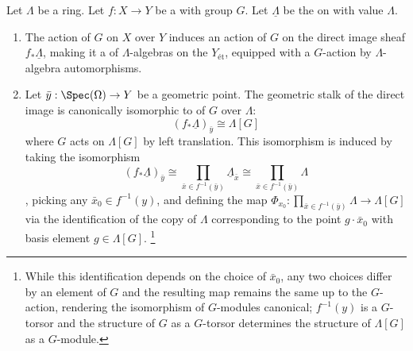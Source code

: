 \begin{proposition} \label{proposition:pushforward_of_constant_sheaf_along_finite_etale_G_cover_has_group_ring_structure}
Let $\Lambda$ be a ring. Let $f: X \to Y$ be a  with group $G$. Let $\underline{\Lambda}$ be the  on  with value $\Lambda$.


\begin{enumerate}
    \item The action of $G$ on $X$ over $Y$ induces an action of $G$ on the direct image sheaf $f_*\underline{\Lambda}$, making it a  of $\Lambda$-algebras on the  $Y_{\text{ét}}$, equipped with a $G$-action by $\Lambda$-algebra automorphisms. 

    \item Let $\bar{y}: \Spec(\Omega) \to Y$ be a geometric point. The geometric stalk of the direct image is canonically isomorphic to  of $G$ over $\Lambda$:
    $$ (f_*\underline{\Lambda})_{\bar{y}} \cong \Lambda[G] $$
    where $G$ acts on $\Lambda[G]$ by left translation. This isomorphism is induced by taking the isomorphism 
    $$ (f_*\underline{\Lambda})_{\bar{y}} \cong \prod_{\bar{x} \in f^{-1}(\bar{y})} \underline{\Lambda}_{\bar{x}} \cong \prod_{\bar{x} \in f^{-1}(\bar{y})} \Lambda$$
    , picking any $\bar{x}_0 \in f^{-1}(y)$, and defining the map $\Phi_{x_0}:\prod_{\bar{x} \in f^{-1}(\bar{y})} \Lambda \to \Lambda[G]$ via the identification of the copy of $\Lambda$ corresponding to the point $g \cdot \bar{x}_0$ with basis element $g \in \Lambda[G]$. \footnote{While this identification depends on the choice of $\bar{x}_0$, any two choices differ by an element of $G$ and the resulting map remains the same up to the $G$-action, rendering the isomorphism of $G$-modules canonical; $f^{-1}(y)$ is a $G$-torsor and the structure of $G$ as a $G$-torsor determines the structure of $\Lambda[G]$ as a $G$-module.}



\end{enumerate}
\end{proposition}
